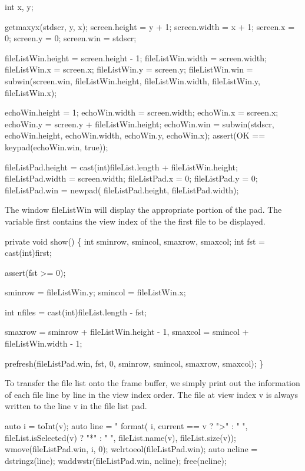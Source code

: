 \nwenddocs{}\endmoddef\nwstartdeflinemarkup\nwenddeflinemarkup
int x, y;

getmaxyx(stdscr, y, x);
screen.height = y + 1;
screen.width  = x + 1;
screen.x      = 0;
screen.y      = 0;
screen.win    = stdscr;

fileListWin.height = screen.height - 1;
fileListWin.width  = screen.width;
fileListWin.x      = screen.x;
fileListWin.y      = screen.y;
fileListWin.win    = subwin(screen.win,
  fileListWin.height,
  fileListWin.width,
  fileListWin.y,
  fileListWin.x);

echoWin.height = 1;
echoWin.width  = screen.width;
echoWin.x      = screen.x;
echoWin.y      = screen.y + fileListWin.height;
echoWin.win    = subwin(stdscr,
  echoWin.height,
  echoWin.width,
  echoWin.y,
  echoWin.x);
assert(OK == keypad(echoWin.win, true));

fileListPad.height = cast(int)fileList.length + fileListWin.height;
fileListPad.width  = screen.width;
fileListPad.x      = 0;
fileListPad.y      = 0;
fileListPad.win    = newpad(
  fileListPad.height,
  fileListPad.width);

\nwendcode{}The window {\Tt{}fileListWin\nwendquote} will display the appropriate portion of
the pad. The variable {\Tt{}first\nwendquote} contains the view index of the the
first file to be displayed.

\nwenddocs{}\endmoddef\nwstartdeflinemarkup\nwenddeflinemarkup
private void show() \{
  int sminrow, smincol, smaxrow, smaxcol;
  int fst = cast(int)first;

  assert(fst >= 0);

  sminrow = fileListWin.y;
  smincol = fileListWin.x;
  
  int nfiles = cast(int)fileList.length - fst;

  smaxrow = sminrow + fileListWin.height - 1,
  smaxcol = smincol + fileListWin.width  - 1;
  
  prefresh(fileListPad.win,
           fst,
           0,
           sminrow,
           smincol,
           smaxrow,
           smaxcol);
\}

\nwendcode{}To transfer the file list onto the frame buffer, we simply print out
the information of each file line by line in the view index order. The
file at view index {\Tt{}v\nwendquote} is always written to the line {\Tt{}v\nwendquote} in the
file list pad.

\nwenddocs{}\endmoddef\nwstartdeflinemarkup\nwenddeflinemarkup
auto i = toInt(v);
auto line = "%
    format(
      i,
      current == v ? ">" : " ",
      fileList.isSelected(v) ? "*" : " ",
      fileList.name(v),
      fileList.size(v));
wmove(fileListPad.win, i, 0);
wclrtoeol(fileListPad.win);
auto ncline = dstringz(line);
waddwstr(fileListPad.win, ncline);
free(ncline);


